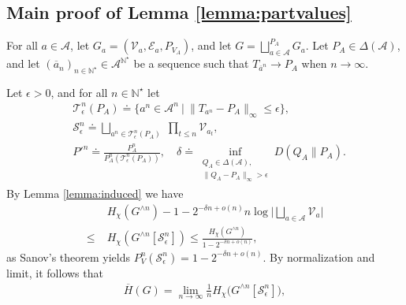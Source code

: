 \documentclass[conference,a4paper]{IEEEtran}
\begin{document}



\iffalse
\subsection{Main proof of Lemma \ref{lemma:partvalues}}

For all $a \in \mathcal{A}$, let $G_a = (\mathcal{V}_a, \mathcal{E}_a, P_{V_A})$, and let $G = \bigsqcup^{P_A}_{a \in \mathcal{A}} G_a$. Let $P_A \in \Delta(\mathcal{A})$, and let $(\overline{a}_n)_{n \in \mathbb{N}^\star} \in \mathcal{A}^{\mathbb{N}^\star}$ be a sequence such that $T_{\overline{a}^n} \rightarrow P_A$ when $n \rightarrow \infty$.

Let $\epsilon > 0$, and for all $n \in \mathbb{N}^\star$ let 
\begin{align}
    & \mathcal{T}^n_\epsilon(P_A) \doteq \big\lbrace a^n \in \mathcal{A}^n \:\big|\: \| T_{a^n} - P_A \|_\infty \leq \epsilon \big\rbrace, \label{eq:lemmapartA0} \\
    & \mathcal{S}_\epsilon^n \doteq \bigsqcup_{a^n \in \mathcal{T}^n_\epsilon(P_A)} \;\prod_{t \leq n} \mathcal{V}_{a_t}, \nonumber\\
    & P'^n \doteq \frac{P^n_A}{P^n_A(\mathcal{T}^n_\epsilon(P_A))}, \quad \delta \doteq \inf_{\substack{Q_A \in \Delta(\mathcal{A}), \\ \|Q_A - P_A\|_\infty > \epsilon}} D(Q_A \| P_A).\nonumber
\end{align}
By Lemma \ref{lemma:induced} we have 
\begin{align}
    & H_\chi(G^{\wedge n}) - 1 - 2^{-\delta n + o(n)}n\log\big|\!\textstyle\bigsqcup_{a \in \mathcal{A}}\mathcal{V}_a\big| \nonumber\\
    \leq \; & H_\chi(G^{\wedge n}[\mathcal{S}^n_\epsilon]) \leq \frac{H_\chi(G^{\wedge n})}{1-2^{-\delta n + o(n)}},
\end{align}
as Sanov's theorem yields $P^n_V(\mathcal{S}^n_\epsilon) = 1-2^{-\delta n + o(n)}$. By normalization and limit, it follows that 
\begin{align}
      \overline{H}(G) = \lim_{n \rightarrow \infty} \frac{1}{n}H_\chi\Big(G^{\wedge n}[\mathcal{S}^n_\epsilon]\Big),\label{eq:conclemmapart1}
\end{align}
\end{document}

